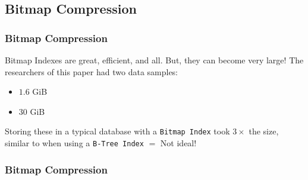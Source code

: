 \documentclass[11pt]{beamer}
\begin{document}
\subsection[Bitmap Compression]{Bitmap Compression}
\begin{frame}
	\frametitle{Bitmap Compression}
	
	Bitmap Indexes are great, efficient, and all. But, they can become very large!
	\pause
	The researchers of this paper had two data samples:
	\begin{itemize}
		\pause
		\item $1.6$ GiB
		\pause
		\item $30$ GiB
	\end{itemize}
	
	\pause
	Storing these in a typical database with a \texttt{Bitmap Index} took $3\times$ the size, similar to when using a \texttt{B-Tree Index} \pause $=$ Not ideal!
\end{frame}

\begin{frame}
	\frametitle{Bitmap Compression}
\end{frame}
\end{document}
